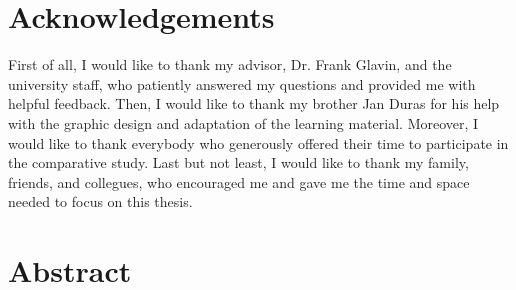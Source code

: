 

\setcounter{page}{1}

\rhead{}

\chapter*{Acknowledgements}

First of all, I would like to thank my advisor, Dr. Frank Glavin, and the university staff, who patiently answered my questions and provided me with helpful feedback.
Then, I would like to thank my brother Jan Duras for his help with the graphic design and adaptation of the learning material.
Moreover, I would like to thank everybody who generously offered their time to participate in the comparative study.
Last but not least, I would like to thank my family, friends, and collegues, who encouraged me and gave me the time and space needed to focus on this thesis.

\glsunsetall %

\tableofcontents

\listoftables

\listoffigures

\glsresetall %

\printglossary[type=\acronymtype, style=long, nonumberlist, title=List of Acronyms]

\chapter*{\vspace{-40pt}Abstract}

